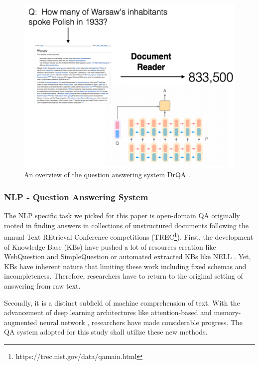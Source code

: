 \begin{figure}[!t]
    \centering
    \includegraphics[width=\linewidth]{img/QA.png}
    \caption{An overview of the question answering system DrQA \cite{}.}
    \label{fig:DrQA_overview}
    \vspace{-10pt}
\end{figure}



\subsubsection{NLP - Question Answering System}

The NLP specific task we picked for this paper is open-domain QA originally rooted in finding answers in collections of unstructured documents following the annual Text REtrieval Conference competitions (TREC\footnote{https://trec.nist.gov/data/qamain.html}). First, the development of Knowledge Base (KBs) have pushed a lot of resources creation like WebQuestion \cite{webquestion} and SimpleQuestion \cite{simplequestion} or automated extracted KBs like NELL \cite{KBNELL}. Yet, KBs have inherent nature that limiting these work including fixed schemas and incompleteness. Therefore, researchers have to return to the original setting of answering from raw text. 



Secondly, it is a distinct subfield of machine comprehension of text. With the advancement of deep learning architectures like attention-based and memory-augmented neural network \cite{}, researchers have made considerable progress.  The QA system adopted for this study shall utilize these new methods.


